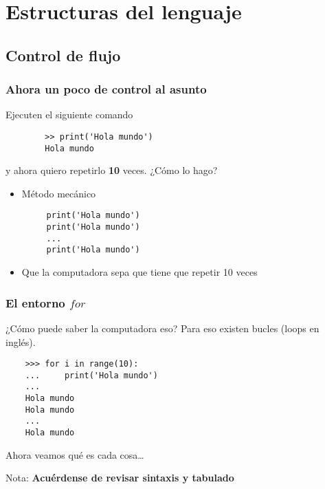 \documentclass{beamer}
\begin{document}

\section{Estructuras del lenguaje}
\subsection{Control de flujo}
\begin{frame}[fragile]
    \frametitle{Ahora un poco de control al asunto}
    Ejecuten el siguiente comando
    \begin{verbatim}
        >> print('Hola mundo')
        Hola mundo
    \end{verbatim}
    y ahora quiero repetirlo \textbf{10} veces. ¿Cómo lo hago?
    \begin{itemize}
    \item<+> Método mecánico \begin{verbatim}
     print('Hola mundo')
     print('Hola mundo')
     ...
     print('Hola mundo')
    \end{verbatim}
    \item<+> Que la computadora sepa que tiene que repetir 10 veces
    \end{itemize}
\end{frame}

\begin{frame}[fragile]
    \frametitle{El entorno $for$}
    ¿Cómo puede saber la computadora eso? Para eso existen bucles (loops en inglés). 
    \begin{verbatim}
    >>> for i in range(10):
    ...     print('Hola mundo')
    ...
    Hola mundo
    Hola mundo
    ...
    Hola mundo
    \end{verbatim}
    Ahora veamos qué es cada cosa\ldots
    
    \vspace{5mm}
    \tiny{Nota: \textbf{Acuérdense de revisar sintaxis y tabulado}}
\end{frame}
    
    

\end{document}

